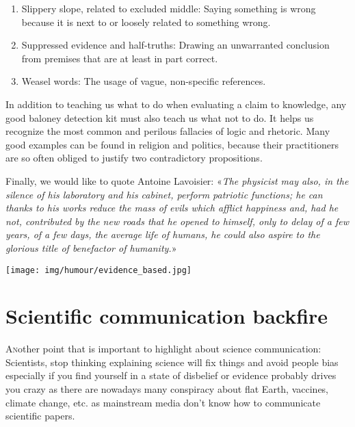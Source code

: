 \begin{enumerate}
		\item Slippery slope, related to excluded middle: Saying something is wrong because it is next to or loosely related to something wrong.

		\item Suppressed evidence and half-truths: Drawing an unwarranted conclusion from premises that are at least in part correct.

		\item Weasel words: The usage of vague, non-specific references.
	\end{enumerate}
	
	In addition to teaching us what to do when evaluating a claim to knowledge, any good baloney detection kit must also teach us what not to do. It helps us recognize the most common and perilous fallacies of logic and rhetoric. Many good examples can be found in religion and politics, because their practitioners are so often obliged to justify two contradictory propositions.


	Finally, we would like to quote Antoine Lavoisier: «\textit{The physicist may also, in the silence of his laboratory and his cabinet, perform patriotic functions; he can thanks to his works reduce the mass of evils which afflict happiness and, had he not, contributed by the new roads that he opened to himself, only to delay of a few years, of a few days, the average life of humans, he could also aspire to the glorious title of benefactor of humanity.}»
	\begin{center}
		\texttt{[image: img/humour/evidence\_based.jpg]}	
	\end{center}
	
	\pagebreak
	\section{Scientific communication backfire}
	\lettrine[lines=4]{\color{BrickRed}A}nother point that is important to highlight about science communication: Scientists, stop thinking explaining science will fix things and avoid people bias especially if you find yourself in a state of disbelief or evidence probably drives you crazy as there are nowadays many conspiracy about flat Earth, vaccines, climate change, etc. as mainstream media don't know how to communicate scientific papers.

